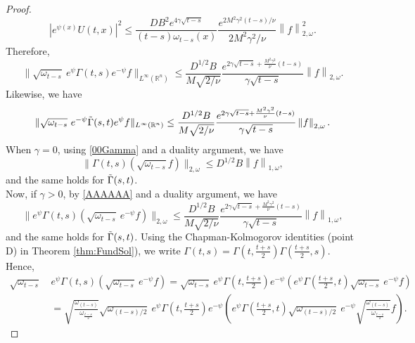 \documentclass[12pt, letterpaper]{amsart}
\theoremstyle{definition}
\theoremstyle{remark}
\numberwithin{equation}{section}
\begin{document}
\begin{proof}
\begin{equation*}
   |e^{\psi(x)} U(t,x)  |^2  \leq \frac{DB^2 e^{4\gamma \sqrt{t-s}}}{(t-s)\omega_{t-s}(x)}\frac{e^{2M^2\gamma^2(t-s)/\nu}}{2M^2\gamma^2/\nu} \left \|f  \right \|^2_{2,\omega}.
\end{equation*}
Therefore,
\begin{equation*}
     \| \sqrt{\omega_{t-s}}\ e^{\psi} \Gamma(t,s)e^{-\psi}f  \|_{L^\infty(\mathbb{R}^n)}\leq \frac{D^{1/2}B}{M\sqrt{2/\nu}}\frac{e^{2\gamma \sqrt{t-s}+\frac{M^2\gamma^2}{\nu}(t-s)}}{\gamma\sqrt{t-s}}  \left \|f  \right \|_{2,\omega}.
\end{equation*}
Likewise, we have
\begin{equation}\label{AAAAAA}
    \| \sqrt{\omega_{t-s}}\ e^{-\psi} \Tilde{\Gamma}(s,t)e^{\psi}f \|_{L^\infty(\mathbb{R}^n)}\leq \frac{D^{1/2}B}{M\sqrt{2/\nu}}\frac{e^{2\gamma \sqrt{t-s}+\frac{M^2\gamma^2}{\nu}(t-s)}}{\gamma\sqrt{t-s}}  \left \|f  \right \|_{2,\omega}.
\end{equation}
When $\gamma=0$, using \eqref{00Gamma} and a duality argument, we have
\begin{equation}\label{CCCC}
      \|\Gamma(t,s)(\sqrt{\omega_{t-s}}f )  \|_{2,\omega} \leq D^{1/2} B \left \|f  \right \|_{1,\omega},
\end{equation}
and the same holds for $\Tilde{\Gamma}(s,t)$.\\
Now, if $\gamma>0$, by \eqref{AAAAAA} and a duality argument, we have
\begin{equation}\label{BBBBB}
      \|e^{\psi}\Gamma(t,s)(\sqrt{\omega_{t-s}}\ e^{-\psi}f )  \|_{2,\omega} \leq \frac{D^{1/2}B}{M\sqrt{2/\nu}}\frac{e^{2\gamma \sqrt{t-s}+\frac{M^2\gamma^2}{\nu}(t-s)}}{\gamma\sqrt{t-s}}  \left \|f  \right \|_{1,\omega},
\end{equation}
and the same holds for $\Tilde{\Gamma}(s,t)$. Using the Chapman-Kolmogorov identities (point D) in Theorem \ref{thm:FundSol}), we write $\Gamma(t,s)=\Gamma(t,\frac{t+s}{2})\Gamma(\frac{t+s}{2},s).$ Hence, 
\begin{align*}
    \sqrt{\omega_{t-s}}\ &e^\psi \Gamma(t,s)(\sqrt{\omega_{t-s}}\ e^{-\psi}f)=\sqrt{\omega_{t-s} }\ e^{\psi}\Gamma(t,\frac{t+s}{2})e^{-\psi} ( e^{\psi}\Gamma(\frac{t+s}{2},t) \sqrt{\omega_{t-s}}\ e^{-\psi}f )
    \\&=\sqrt{\frac{\omega_{(t-s)}}{\omega_{\frac{t-s}{2}}}}\sqrt{\omega_{(t-s)/2}}\ e^{\psi}\Gamma(t,\frac{t+s}{2})e^{-\psi} \left ( e^{\psi}\Gamma(\frac{t+s}{2},t) \sqrt{\omega_{(t-s)/2}}\ e^{-\psi}\sqrt{\frac{\omega_{(t-s)}}{\omega_{\frac{t-s}{2}}}}f \right ).

\end{align*}
\end{proof}
\end{document}
